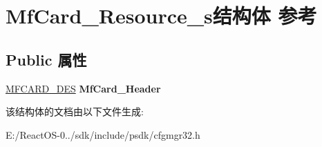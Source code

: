 \hypertarget{struct_mf_card___resource__s}{}\section{Mf\+Card\+\_\+\+Resource\+\_\+s结构体 参考}
\label{struct_mf_card___resource__s}
\subsection*{Public 属性}
\begin{DoxyCompactItemize}
\item 
\mbox{\label{struct_mf_card___resource__s_aaa34fc77e92c594e7e44797cd6d93c7c}} 
\hyperlink{struct_mf_card___des__s}{M\+F\+C\+A\+R\+D\+\_\+\+D\+ES} {\bfseries Mf\+Card\+\_\+\+Header}
\end{DoxyCompactItemize}


该结构体的文档由以下文件生成\+:\begin{DoxyCompactItemize}
\item 
E\+:/\+React\+O\+S-\/0../sdk/include/psdk/cfgmgr32.\+h\end{DoxyCompactItemize}

